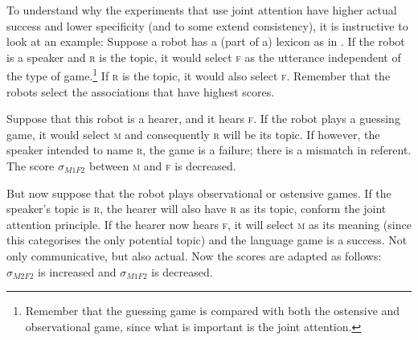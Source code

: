 To understand why the experiments that use joint attention have higher actual success and lower specificity (and to some extend consistency), it is instructive to look at an example: Suppose a robot has a (part of a) lexicon as in . If the robot is a speaker and {\scshape r} is the topic, it would select {\scshape f} as the utterance independent of the type of game.\footnote{Remember that the guessing game is compared with both the ostensive and observational game, since what is important is the joint attention.} If {\scshape r} is the topic, it would also select {\scshape f}. Remember that the robots select the associations that have highest scores.

Suppose that this robot is a hearer, and it hears {\scshape f}. If the robot plays a guessing game, it would select {\scshape m} and consequently {\scshape r} will be its topic. If however, the speaker intended to name {\scshape r}, the game is a failure; there is a mismatch in referent. The score $\sigma_{M1F2}$ between {\scshape m} and {\scshape f} is decreased.

But now suppose that the robot plays observational or ostensive games. If the speaker's topic is {\scshape r}, the hearer will also have {\scshape r} as its topic, conform the joint attention principle. If the hearer now hears {\scshape f}, it will select {\scshape m} as its meaning (since this categorises the only potential topic) and the language game is a success. Not only communicative, but also actual. Now the scores are adapted as follows: $\sigma_{M2F2}$ is increased and $\sigma_{M1F2}$ is decreased.

